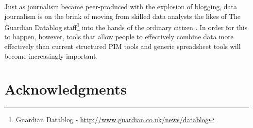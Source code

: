 \documentclass{sigchi}
\begin{document}
Just as journalism became peer-produced with the explosion of blogging, data journalism is on the brink of moving from skilled data analysts the likes of The Guardian Datablog staff\footnote{Guardian Datablog - \url{http://www.guardian.co.uk/news/datablog}} into the hands of the ordinary citizen \cite{datajournalismhandbook}.  In order for this to happen, however, tools that allow people to effectively combine data more effectively than current structured PIM tools and generic spreadsheet tools will become increasingly important. 

\section{Acknowledgments}


%
%
%
%
%
\balance



\end{document}

